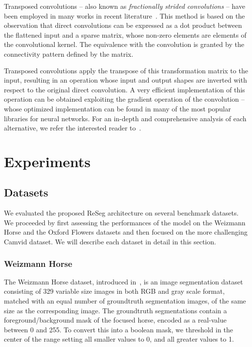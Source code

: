 Transposed convolutions -- also known as \emph{fractionally strided
convolutions} -- have been employed in many works in recent
literature~\cite{Zeiler-ICCV2011,ZeilerFergus14,long2015fully,
radford2015unsupervised,im2016generating}. This method is based on the observation
that direct convolutions can be expressed as a dot product between the
flattened input and a sparse matrix, whose non-zero elements are elements of the
convolutional kernel. The equivalence with the convolution is granted by the
connectivity pattern defined by the matrix.

Transposed convolutions apply the transpose of this transformation matrix to
the input, resulting in an operation whose input and output shapes are inverted
with respect to the original direct convolution. A very efficient implementation of
this operation can be obtained exploiting the gradient operation of the
convolution -- whose optimized implementation can be found in many of the most
popular libraries for neural networks. For an in-depth and comprehensive
analysis of each alternative, we refer the interested reader
to~\cite{dumoulin2016guide}.

\section{Experiments}\label{sec:reseg_experiments}

\subsection{Datasets}
We evaluated the proposed ReSeg architecture on several benchmark datasets.
We proceeded by first assessing the performances of the model on the Weizmann
Horse and the Oxford Flowers datasets and then focused on the more challenging
Camvid dataset. We will describe each dataset in detail in this section.

\subsubsection{Weizmann Horse}
The Weizmann Horse dataset, introduced in~\cite{Borenstein04combiningtop-down},
is an image
segmentation dataset consisting of 329 variable size images in both RGB and
gray scale
format, matched with an equal number of groundtruth segmentation images, of
the same size as the corresponding image.
The groundtruth segmentations contain a foreground/background mask of the
focused horse, encoded as a real-value between 0 and 255. To convert this into
a boolean mask, we threshold in the center of the range setting all smaller
values to 0, and all greater values to 1.

